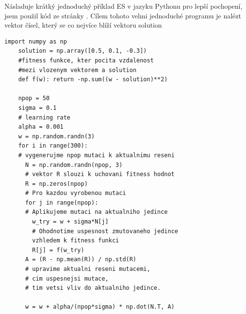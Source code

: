   Násladuje krátký jednoduchý příklad ES v jazyku Pythonu pro lepší pochopení, jsem použil kód ze stránky \cite{openAiEs}. Cílem tohoto velmi jednoduché programu je nalézt vektor čísel, který se co nejvíce blíží vektoru solution
  \lstset{language=Python}
  \begin{lstlisting}[frame=single]  % Start your code-block
    import numpy as np
    solution = np.array([0.5, 0.1, -0.3])
    #fitness funkce, kter pocita vzdalenost
    #mezi vlozenym vektorem a solution 
    def f(w): return -np.sum((w - solution)**2)
    
    npop = 50     
    sigma = 0.1    
    # learning rate
    alpha = 0.001  
    w = np.random.randn(3)
    for i in range(300): 
    # vygenerujme npop mutaci k aktualnimu reseni
      N = np.random.randn(npop, 3) 
      # vektor R slouzi k uchovani fitness hodnot
      R = np.zeros(npop) 
      # Pro kazdou vyrobenou mutaci
      for j in range(npop): 
      # Aplikujeme mutaci na aktualniho jedince
        w_try = w + sigma*N[j]
        # Ohodnotime uspesnost zmutovaneho jedince 
        vzhledem k fitness funkci
        R[j] = f(w_try) 
      A = (R - np.mean(R)) / np.std(R) 
      # upravime aktualni reseni mutacemi, 
      # cim uspesnejsi mutace, 
      # tim vetsi vliv do aktualniho jedince.

      w = w + alpha/(npop*sigma) * np.dot(N.T, A)  
     \end{lstlisting}
